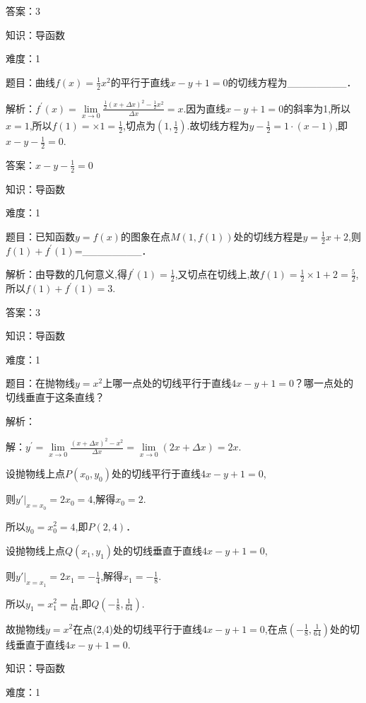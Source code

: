 \documentclass{article} %
\begin{document}
答案：3



知识：导函数

难度：1

题目：曲线$f(x)=\frac{1}{2}x^{2}$的平行于直线$x-y+1=0$的切线方程为\_\_\_\_\_\_\_\_．

解析：$f^{'}(x)=\lim\limits_{x \rightarrow 0}\frac{\frac{1}{2}{(x+\Delta x)}^2-\frac{1}{2}x^2}{\Delta x}=x$.因为直线$x-y+1=0$的斜率为1,所以$x=1$,所以$f(1)=\times 1=\frac{1}{2}$,切点为$(1,\frac{1}{2})$.故切线方程为$y-\frac{1}{2}=1·(x-1)$,即$x-y-\frac{1}{2}=0$.

答案：$x-y-\frac{1}{2}=0$



知识：导函数

难度：1

题目：已知函数$y=f(x)$的图象在点$M(1,f(1))$处的切线方程是$y=\frac{1}{2}x+2$,则$f(1)+f^{'}(1)$=\_\_\_\_\_\_\_\_．

解析：由导数的几何意义,得$f^{'}(1)=\frac{1}{2}$,又切点在切线上,故$f(1)=\frac{1}{2}{\times}1+2=\frac{5}{2}$,所以$f(1)+f^{'}(1)=3$.

答案：3



知识：导函数

难度：1

题目：在抛物线$y=x^{2}$上哪一点处的切线平行于直线$4x-y+1=0$？哪一点处的切线垂直于这条直线？

解析：

解：$y^{'}=\lim\limits_{x \rightarrow 0}\frac{{(x+\Delta x)}^2-x^2}{\Delta x}=\lim\limits_{x \rightarrow 0}(2x+\Delta x)=2x$.

设抛物线上点$P(x_{0},y_{0})$处的切线平行于直线$4x-y+1=0$,



则$y'|_{x=x_0}=2x_0=4$,解得$x_{0}=2$.

所以$y_{0}=x_0^2=4$,即$P(2,4)$．

设抛物线上点$Q(x_{1},y_{1})$处的切线垂直于直线$4x-y+1=0$,

则$y'|_{x=x_1}=2x_1=-\frac{1}{4}$,解得$x_{1}=-\frac{1}{8}$.

所以$y_{1}=x_1^2=\frac{1}{64}$,即$Q(-\frac{1}{8},\frac{1}{64})$.

故抛物线$y=x^{2}$在点(2,4)处的切线平行于直线$4x-y+1=0$,在点$(-\frac{1}{8},\frac{1}{64})$处的切线垂直于直线$4x-y+1=0$.



知识：导函数

难度：1
\end{document}
